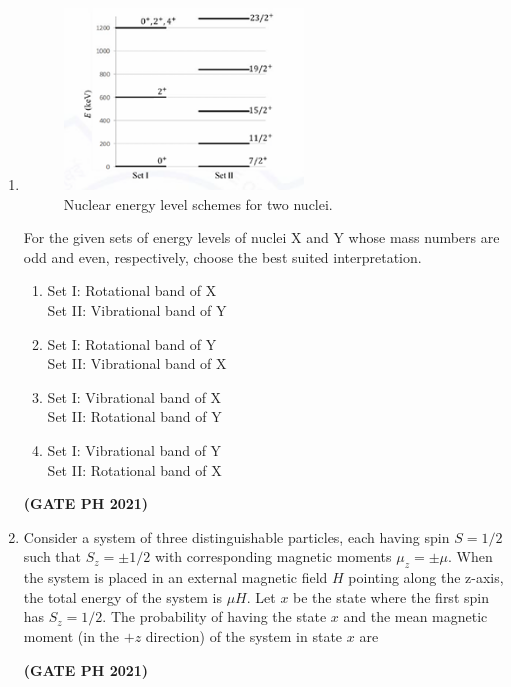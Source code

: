 \documentclass[14pt, a4paper]{extarticle}
\begin{document}
\begin{enumerate}[label=\textbf{Q.\arabic*}]
\begin{enumerate}[label=\textbf{Q.\arabic*}]
\item
\begin{figure}[H]
\centering
\includegraphics[width=0.6\textwidth]{figs/q42fig21.png}
\caption{Nuclear energy level schemes for two nuclei.}
\label{fig:q32ph}
\end{figure}
For the given sets of energy levels of nuclei X and Y whose mass numbers are odd and even, respectively, choose the best suited interpretation.
\begin{enumerate}
\item Set I: Rotational band of X \\ Set II: Vibrational band of Y
\item Set I: Rotational band of Y \\ Set II: Vibrational band of X
\item Set I: Vibrational band of X \\ Set II: Rotational band of Y
\item Set I: Vibrational band of Y \\ Set II: Rotational band of X
\end{enumerate}
\hfill \textbf{(GATE PH 2021)}

\item Consider a system of three distinguishable particles, each having spin $S = 1/2$ such that $S_z = \pm 1/2$ with corresponding magnetic moments $\mu_z = \pm \mu$. When the system is placed in an external magnetic field $H$ pointing along the z-axis, the total energy of the system is $\mu H$. Let $x$ be the state where the first spin has $S_z = 1/2$. The probability of having the state $x$ and the mean magnetic moment (in the $+z$ direction) of the system in state $x$ are
\begin{enumerate}
\end{enumerate}
\hfill \textbf{(GATE PH 2021)}


\end{enumerate}
\end{enumerate}
\end{document}
